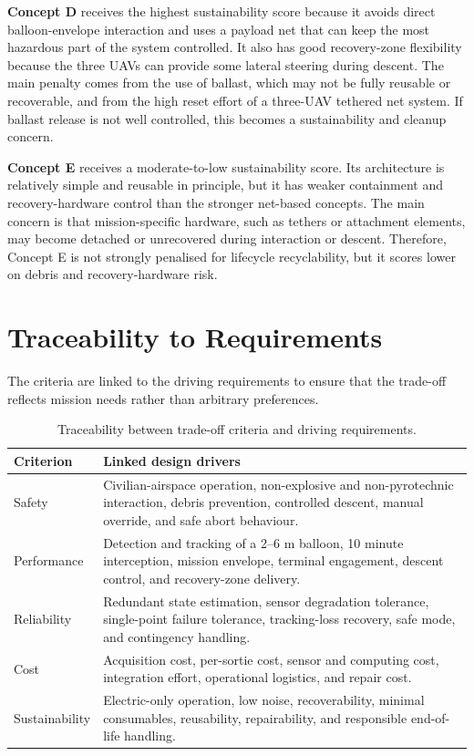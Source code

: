 \textbf{Concept D} receives the highest sustainability score because it avoids direct balloon-envelope interaction and uses a payload net that can keep the most hazardous part of the system controlled. It also has good recovery-zone flexibility because the three UAVs can provide some lateral steering during descent. The main penalty comes from the use of ballast, which may not be fully reusable or recoverable, and from the high reset effort of a three-UAV tethered net system. If ballast release is not well controlled, this becomes a sustainability and cleanup concern.

\textbf{Concept E} receives a moderate-to-low sustainability score. Its architecture is relatively simple and reusable in principle, but it has weaker containment and recovery-hardware control than the stronger net-based concepts. The main concern is that mission-specific hardware, such as tethers or attachment elements, may become detached or unrecovered during interaction or descent. Therefore, Concept E is not strongly penalised for lifecycle recyclability, but it scores lower on debris and recovery-hardware risk.





\section{Traceability to Requirements}

The criteria are linked to the driving requirements to ensure that the trade-off reflects mission needs rather than arbitrary preferences.

\begin{table}[H]
\centering
\small
\caption{Traceability between trade-off criteria and driving requirements.}
\label{tab:trade_criteria_traceability}
\begin{tabularx}{\textwidth}{p{} X}
\toprule
\textbf{Criterion} & \textbf{Linked design drivers} \\
\midrule
Safety & Civilian-airspace operation, non-explosive and non-pyrotechnic interaction, debris prevention, controlled descent, manual override, and safe abort behaviour. \\
Performance & Detection and tracking of a 2--6 m balloon, 10 minute interception, mission envelope, terminal engagement, descent control, and recovery-zone delivery. \\
Reliability & Redundant state estimation, sensor degradation tolerance, single-point failure tolerance, tracking-loss recovery, safe mode, and contingency handling. \\
Cost & Acquisition cost, per-sortie cost, sensor and computing cost, integration effort, operational logistics, and repair cost. \\
Sustainability & Electric-only operation, low noise, recoverability, minimal consumables, reusability, repairability, and responsible end-of-life handling. \\
\bottomrule
\end{tabularx}
\end{table}



